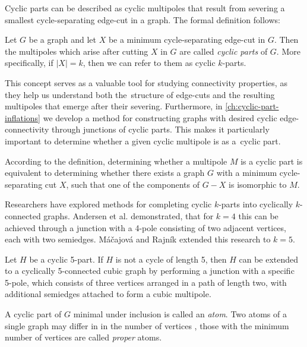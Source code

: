 \documentclass[12pt, twoside]{book}
\begin{document}
Cyclic parts can be described as cyclic multipoles that result from severing a smallest cycle-separating edge-cut in a graph. The formal definition follows:

\begin{definition}
	Let $G$ be a graph and let $X$ be a minimum cycle-separating edge-cut in $G$. Then the multipoles which arise after cutting $X$ in $G$ are called \textit{cyclic parts} of $G$. More specifically, if $|X|=k$, then we can refer to them as cyclic $k$-parts.
\end{definition}

This concept serves as a valuable tool for studying connectivity properties, as they help us understand both the~structure of edge-cuts and the resulting multipoles that emerge after their severing. Furthermore, in \cref{ch:cyclic-part-inflations} we develop a method for constructing graphs with desired cyclic \mbox{edge-connectivity} through junctions of cyclic parts. This makes it particularly important to determine whether a given cyclic multipole is as a~cyclic part.

According to the definition, determining whether a multipole $M$ is a cyclic part is equivalent to determining whether there exists a graph $G$ with a minimum cycle-separating cut $X$, such that one of the components of $G-X$ is isomorphic to $M$.

Researchers have explored methods for completing cyclic $k$-parts into cyclically $k$-connected graphs. Andersen et al. \cite{Andersen1988} demonstrated, that for $k=4$ this can be achieved through a junction with a 4-pole consisting of two adjacent vertices, each with two semiedges. Máčajová and Rajník \cite{Macajova2022} extended this research to $k=5$.

\begin{theorem}
	Let $H$ be a cyclic 5-part. If $H$ is not a cycle of length 5, then $H$ can be extended to a cyclically 5-connected cubic graph by performing a junction with a specific 5-pole, which consists of three vertices arranged in a path of length two, with additional semiedges attached to form a cubic multipole.
\end{theorem}

A cyclic part of $G$ minimal under inclusion is called an \textit{atom}. Two atoms of a single graph may differ in in the number of vertices \cite{atoms-of-cyclic}, those with the minimum number of vertices are called \textit{proper} atoms.
\end{document}

